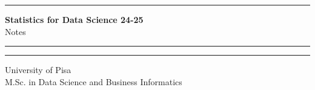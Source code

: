 \documentclass[11pt]{article}
\begin{document}
\begin{titlepage}
    \hrule
    \vspace{15pt}
    \begin{center}
        \Huge{\textbf{\Huge \textbf{Statistics for Data Science 24-25}} \\ Notes}\\
    \end{center}
    \vspace{15pt}
    \hrule
    \vfill
    \hrule
    \begin{center}
        \Large University of Pisa \\ M.Sc. in Data Science and Business Informatics
    \end{center}
\end{titlepage}

\tableofcontents
\clearpage

\clearpage
\clearpage
\clearpage
\clearpage
\clearpage
\clearpage
\clearpage
\clearpage

\end{document}

